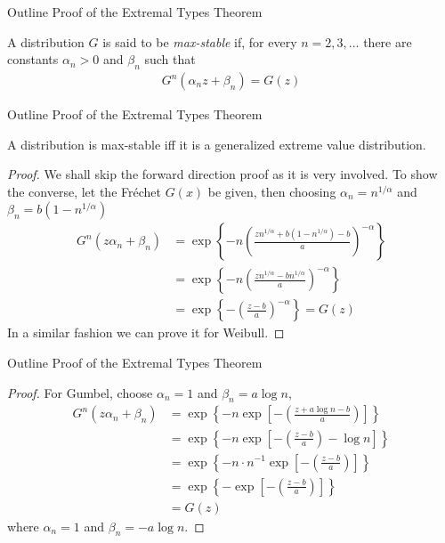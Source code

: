 \documentclass[10pt]{beamer}
\begin{document}
\begin{frame}{Outline Proof of the Extremal Types Theorem}
\begin{definition}
A distribution $G$ is said to be \emph{max-stable} if, for every $n=2,3,\ldots$ there are constants $\alpha_n>0$ and $\beta_n$ such that
\begin{align*}
G^n(\alpha_nz+\beta_n) = G(z)
\end{align*}
\end{definition}
\end{frame}

\begin{frame}{Outline Proof of the Extremal Types Theorem}
\begin{theorem}\label{thm:maxstablegev}
A distribution is max-stable iff it is a generalized extreme value distribution.
\begin{proof}
We shall skip the forward direction proof as it is very involved. To show the converse, let the Fr\'echet $G(x)$ be given, then choosing $\alpha_n = n^{1/\alpha}$ and $\beta_n = b(1-n^{1/\alpha})$
\begin{align*}
G^n(z\alpha_n+\beta_n) &= \exp\left\{-n\left(\frac{zn^{1/\alpha}+b(1-n^{1/\alpha})-b}{a}\right)^{-\alpha}\right\}\\
&= \exp\left\{-n\left(\frac{zn^{1/\alpha}-bn^{1/\alpha}}{a}\right)^{-\alpha}\right\}\\
&= \exp\left\{-\left(\frac{z-b}{a}\right)^{-\alpha}\right\}=G(z)
\end{align*}
In a similar fashion we can prove it for Weibull. 
\end{proof}
\end{theorem}
\end{frame}

\begin{frame}{Outline Proof of the Extremal Types Theorem}
\begin{proof}
For Gumbel, choose $\alpha_n = 1$ and $\beta_n = a\log n$, 
\begin{align*}
G^n(z\alpha_n+\beta_n) &= \exp\left\{-n\exp\left[-\left(\frac{z+a\log n-b}{a}\right)\right]\right\} \\
&= \exp\left\{-n\exp\left[-\left(\frac{z-b}{a}\right)-\log n\right]\right\} \\
&= \exp\left\{-n\cdot n^{-1}\exp\left[-\left(\frac{z-b}{a}\right)\right]\right\}\\
&= \exp\left\{-\exp\left[-\left(\frac{z-b}{a}\right)\right]\right\} \\
&=G(z)
\end{align*}
where $\alpha_n = 1$ and $\beta_n = -a\log n$.
\end{proof}
\end{frame}
\end{document}
